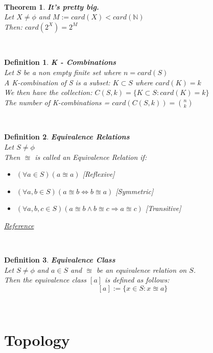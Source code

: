 \documentclass[12pt]{extarticle}
\theoremstyle{plain}
\newtheorem{thm}{Theorem}[section]
\theoremstyle{plain}
\theoremstyle{plain}
\theoremstyle{Definition}
\newtheorem{def.}{Definition}[section]
\theoremstyle{Definition}
\theoremstyle{plain}
\newcommand{\cut}[0]{\noindent\framebox[\linewidth]{\rule{\linewidth}{2pt}}\\}
\begin{document}
\cut
\begin{thm} \textbf{It's pretty big.} \\ 
	Let $X \not = \phi$ and $M := card(X) < card(\mathbb{N})$ \\
	Then: $card(2^X) = 2^M$ 
\end{thm}
\cut
\begin{def.} \textbf{K - Combinations} \\
	Let $S$ be a non empty finite set where $n = card(S)$ \\ 
	A K-combination of S is a subset: $K \subset S$ where $card(K) = k$ \\ 
	We then have the collection: $C(S,k) = \{K \subset S : card(K) = k\}$ \\
	The number of K-combinations = $card(C(S,k)) = \binom{n}{k}$
\end{def.}
\cut
\begin{def.} \textbf{Equivalence Relations} \\
	Let $S \not = \phi$ \\ 
	Then $\approxeq$ is called an Equivalence Relation if: 
	\begin{itemize}
		\item $(\forall a \in S)(a \approxeq a)$ \hfill [Reflexive]
		\item $(\forall a,b \in S)(a \approxeq b \Leftrightarrow b \approxeq a)$ \hfill [Symmetric]
		\item $(\forall a,b,c \in S)(a \approxeq b \wedge b \approxeq c \Rightarrow a \approxeq c)$ \hfill [Transitive] 
	\end{itemize}
\href{https://en.wikipedia.org/wiki/Equivalence_relation}{Reference}
\end{def.}
\cut
\begin{def.} \textbf{Equivalence Class} \\
	Let $S \not = \phi$ and $a \in S$ and $\approxeq$ be an equivalence relation on $S$. \\
	Then the equivalence class $[a]$ is defined as follows: 
		$$[a] := \{x \in S : x \approxeq a\}$$
\end{def.}
\cut
\section{Topology}
\end{document}
